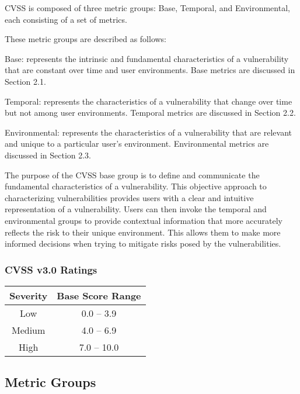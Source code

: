     CVSS is composed of three metric groups: Base, Temporal, and
    Environmental, each consisting of a set of metrics.

    These metric groups are described as follows:

    Base: represents the intrinsic and fundamental characteristics of a
    vulnerability that are constant over time and user environments. Base
    metrics are discussed in Section 2.1.

    Temporal: represents the characteristics of a vulnerability that change
    over time but not among user environments. Temporal metrics are
    discussed in Section 2.2.

    Environmental: represents the characteristics of a vulnerability that
    are relevant and unique to a particular user's environment.
    Environmental metrics are discussed in Section 2.3.

    The purpose of the CVSS base group is to define and communicate the
    fundamental characteristics of a vulnerability. This objective approach
    to characterizing vulnerabilities provides users with a clear and
    intuitive representation of a vulnerability. Users can then invoke the
    temporal and environmental groups to provide contextual information that
    more accurately reflects the risk to their unique environment. This
    allows them to make more informed decisions when trying to mitigate
    risks posed by the vulnerabilities.

    \subsubsection{CVSS v3.0 Ratings}\label{subsec:cvss-v3.0-ratings}

      \begin{center}
        \begin{tabularx}{0.4\textwidth}{c c}
          \toprule
          \textbf{Severity} & \textbf{Base Score Range} \\ \midrule
          Low    & 0.0 -- 3.9  \\ \midrule
          Medium & 4.0 -- 6.9  \\ \midrule
          High   & 7.0 -- 10.0 \\
          \bottomrule
        \end{tabularx}
      \end{center}

    \subsection{Metric Groups}\label{subsec:metric-groups}

